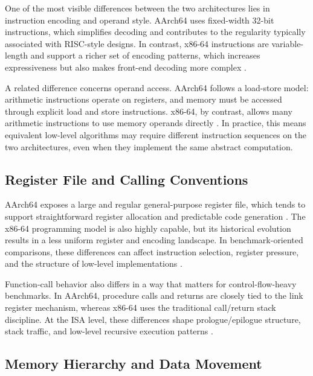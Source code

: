 \documentclass{tcsa}
\begin{document}
One of the most visible differences between the two architectures lies in 
instruction encoding and operand style. AArch64 uses fixed-width 32-bit 
instructions, which simplifies decoding and contributes to the regularity typically 
associated with RISC-style designs. In contrast, x86-64 instructions are 
variable-length and support a richer set of encoding patterns, which increases 
expressiveness but also makes front-end decoding more complex \cite{arm_a_profile_ref_manual,intel_sdm_vol2a_2025,hennessy_patterson_2019}.

A related difference concerns operand access. AArch64 follows a load-store model: 
arithmetic instructions operate on registers, and memory must be accessed through 
explicit load and store instructions. x86-64, by contrast, allows many arithmetic 
instructions to use memory operands directly \cite{arm_a_profile_ref_manual,intel_sdm_vol2a_2025}. In practice, this means equivalent 
low-level algorithms may require different instruction sequences on the two 
architectures, even when they implement the same abstract computation.

\subsection{Register File and Calling Conventions}

AArch64 exposes a large and regular general-purpose register file, which tends to 
support straightforward register allocation and predictable code generation \cite{arm_a_profile_ref_manual}. The 
x86-64 programming model is also highly capable, but its historical evolution 
results in a less uniform register and encoding landscape. In benchmark-oriented 
comparisons, these differences can affect instruction selection, register pressure, and 
the structure of low-level implementations \cite{intel_sdm_vol2a_2025,intel_optimization_manual_2024}.

Function-call behavior also differs in a way that matters for control-flow-heavy 
benchmarks. In AArch64, procedure calls and returns are closely tied to the link 
register mechanism, whereas x86-64 uses the traditional call/return stack 
discipline. At the ISA level, these differences shape prologue/epilogue structure, 
stack traffic, and low-level recursive execution patterns \cite{aapcs64,intel_sdm_vol2a_2025}.

\subsection{Memory Hierarchy and Data Movement}
\end{document}
